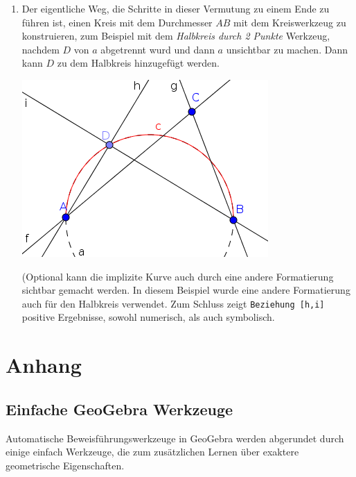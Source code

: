 \documentclass{article}
\begin{document}
\begin{enumerate}
\begin{enumerate}
      \item Der eigentliche Weg, die Schritte in dieser Vermutung zu einem Ende zu führen ist,  einen Kreis mit dem Durchmesser $AB$ mit dem Kreiswerkzeug zu konstruieren, zum Beispiel mit dem \textit{Halbkreis durch 2 Punkte} Werkzeug, nachdem $D$ von $a$ abgetrennt wurd und dann $a$ unsichtbar zu machen. Dann kann $D$ zu dem Halbkreis hinzugefügt werden.
\begin{center}
\includegraphics[scale=0.5]{limitations-Thales1-3}
\end{center}
      (Optional kann die implizite Kurve auch durch eine andere Formatierung sichtbar gemacht werden. In diesem Beispiel wurde eine andere Formatierung auch für den Halbkreis verwendet. Zum Schluss zeigt \texttt{Beziehung [h,i]} positive Ergebnisse, sowohl numerisch, als auch symbolisch.
    \end{enumerate}
\end{enumerate}


\section{Anhang}
\subsection{Einfache GeoGebra Werkzeuge}

Automatische Beweisführungswerkzeuge in GeoGebra werden abgerundet durch einige einfach Werkzeuge, die zum zusätzlichen Lernen über exaktere geometrische Eigenschaften.
\end{document}
